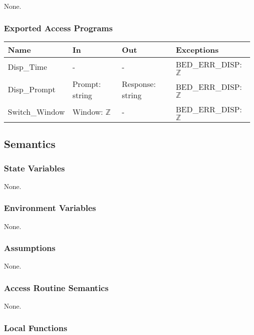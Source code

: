 \documentclass[12pt, titlepage]{article}
\begin{document}
None.

\subsubsection{Exported Access Programs}

\begin{center}
\begin{tabular}{p{3cm} p{3cm} p{4cm} p{2cm}}
\hline
\textbf{Name} & \textbf{In} & \textbf{Out} & \textbf{Exceptions} \\
\hline
Disp\_Time & - & - & BED\_ERR\_DISP: $\mathbb{Z}$ \\
Disp\_Prompt & Prompt: string & Response: string & BED\_ERR\_DISP: $\mathbb{Z}$ \\
Switch\_Window & Window:  $\mathbb{Z}$ & - &  BED\_ERR\_DISP: $\mathbb{Z}$ \\
\hline
\end{tabular}
\end{center}

\subsection{Semantics}

\subsubsection{State Variables}

None.

\subsubsection{Environment Variables}

None.

\subsubsection{Assumptions}

None.

\subsubsection{Access Routine Semantics}

None.

\subsubsection{Local Functions}
\end{document}
